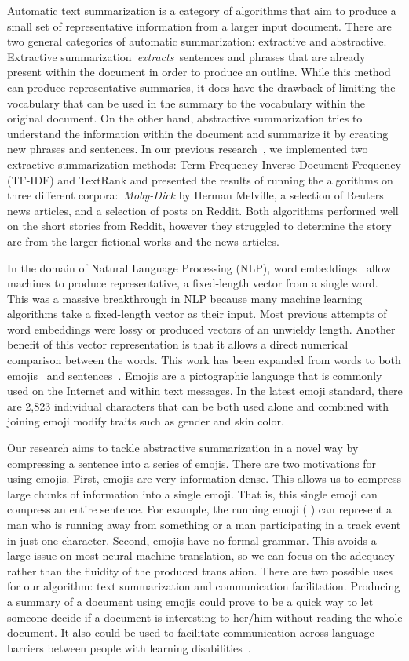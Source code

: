 \documentclass{article}[10]
\newcommand*{\img}[1]{%
  \raisebox{-.3\baselineskip}{%
    \texttt{[image: \#1]}%
  }%
}
\begin{document}
Automatic text summarization is a category of algorithms that aim to
produce a small set of representative information from a larger input
document. There are two general categories of automatic summarization:
extractive and abstractive. Extractive
summarization~\emph{extracts~}sentences and phrases that are already
present within the document in order to produce an outline. While this
method can produce representative summaries, it does have the drawback
of limiting the vocabulary that can be used in the summary to the
vocabulary within the original document. On the other hand, abstractive
summarization tries to understand the information within the document
and summarize it by creating new phrases and sentences. In our previous
research~\cite{day_extractive}, we implemented two extractive summarization
methods: Term Frequency-Inverse Document Frequency (TF-IDF) and TextRank
and presented the results of running the algorithms on three different
corpora:~\emph{Moby-Dick} by Herman Melville, a selection of Reuters news
articles, and a selection of posts on Reddit. Both algorithms performed
well on the short stories from Reddit, however they struggled to
determine the story arc from the larger fictional works and the news
articles.


In the domain of Natural Language Processing (NLP), word
embeddings~\cite{mikolov2013efficient} allow machines to produce representative,
a fixed-length vector from a single word. This was a massive
breakthrough in NLP because many machine
learning algorithms take a fixed-length vector as their input. Most
previous attempts of word embeddings were lossy or produced vectors of
an unwieldy length. Another benefit of this vector representation is
that it allows a direct numerical comparison between the words. This
work has been expanded from words to both emojis~\cite{Eisner_2016}
and sentences~\cite{pg2017unsu}. Emojis are a
pictographic language that is commonly used on the Internet and within
text messages. In the latest emoji
standard, there are 2,823 individual characters that can be both used alone and
combined with joining emoji modify traits such as gender and skin color.

Our research aims to tackle abstractive summarization in a novel way by
compressing a sentence into a series of emojis. There are two motivations for
using emojis. First, emojis are very information-dense. This allows us to
compress large chunks of information into a single emoji. That is, this single
emoji can compress an entire sentence. For example, the running emoji (\img{emojis/1f3c3.png}) can represent a man who is running away from something
or a man participating in a track event in just one
character. Second, emojis have no formal grammar. This avoids a large issue on most
neural machine translation, so we can focus on the adequacy rather than
the fluidity of the produced translation. There are two possible uses
for our algorithm: text summarization and communication facilitation.
Producing a summary of a document using emojis could prove to be a
quick way to let someone decide if a document is interesting to her/him
without reading the whole document. It also could be used to facilitate
communication across language barriers between people with learning
disabilities~\cite{vandeghinste2017translating}.
\end{document}
